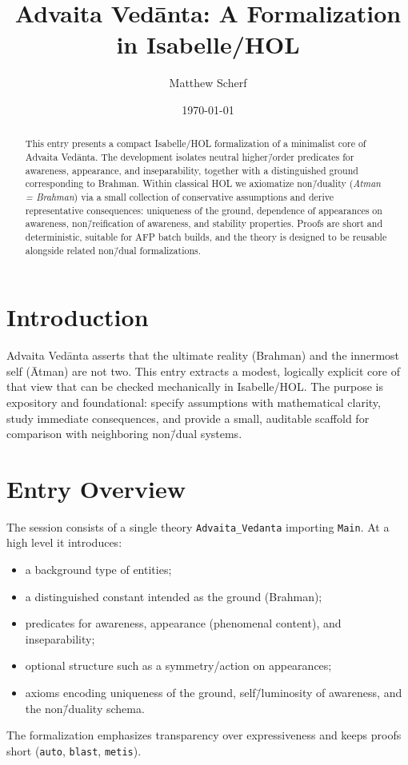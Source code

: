 \documentclass[11pt,a4paper]{article}
\title{Advaita Vedānta: A Formalization in Isabelle/HOL}
\author{Matthew Scherf}
\date{\today}
\begin{document}
\maketitle

\begin{abstract}
This entry presents a compact Isabelle/HOL formalization of a minimalist core of
Advaita Vedānta. The development isolates neutral higher\=/order predicates for
awareness, appearance, and inseparability, together with a distinguished ground
corresponding to Brahman. Within classical HOL we axiomatize non\=/duality
(\emph{Atman = Brahman}) via a small collection of conservative assumptions and
derive representative consequences: uniqueness of the ground, dependence of
appearances on awareness, non\=/reification of awareness, and stability
properties. Proofs are short and deterministic, suitable for AFP batch builds,
and the theory is designed to be reusable alongside related non\=/dual
formalizations.
\end{abstract}

\tableofcontents
\bigskip

\section{Introduction}

Advaita Vedānta asserts that the ultimate reality (Brahman) and the innermost
self (Ātman) are not two. This entry extracts a modest, logically explicit core
of that view that can be checked mechanically in Isabelle/HOL. The purpose is
expository and foundational: specify assumptions with mathematical clarity,
study immediate consequences, and provide a small, auditable scaffold for
comparison with neighboring non\=/dual systems.

\section{Entry Overview}

The session consists of a single theory \texttt{Advaita\_Vedanta} importing
\texttt{Main}. At a high level it introduces:
\begin{itemize}
  \item a background type of entities;
  \item a distinguished constant intended as the ground (Brahman);
  \item predicates for awareness, appearance (phenomenal content), and
        inseparability;
  \item optional structure such as a symmetry/action on appearances;
  \item axioms encoding uniqueness of the ground, self\=/luminosity of
        awareness, and the non\=/duality schema.
\end{itemize}
The formalization emphasizes transparency over expressiveness and keeps proofs
short (\texttt{auto}, \texttt{blast}, \texttt{metis}).
\end{document}
